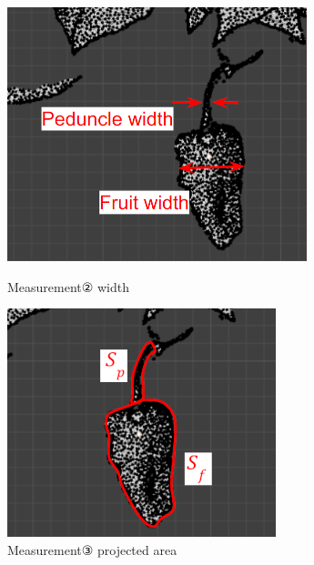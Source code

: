 \begin{figure}[H]
  \begin{minipage}[b]{0.48\columnwidth}
    \centering
    \includegraphics[width=\columnwidth]{images/png/measurement2.png}
    \caption{Measurement② width}
    \label{Fig:measurement2}
  \end{minipage}
  \hspace{0.04\columnwidth}
  \begin{minipage}[b]{0.48\columnwidth}
    \centering
    \includegraphics[width=\columnwidth]{images/png/measurement3.png}
    \caption{Measurement③ projected area}
    \label{Fig:measurement3}
  \end{minipage}
\end{figure}